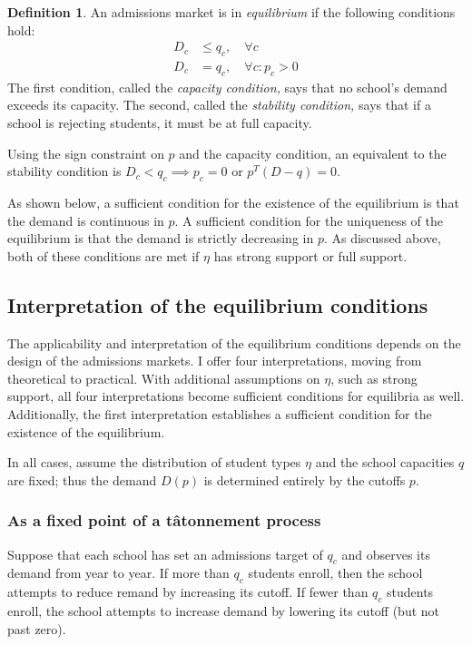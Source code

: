\documentclass[12pt]{article}
\theoremstyle{definition}
\newtheorem{definition}{Definition}
\begin{document}
\begin{definition} \label{marketeqconditions} An admissions market is in \emph{equilibrium} if the following conditions hold:
\begin{align} D_c &\leq q_c, \quad \forall c \label{capacitycondition} \\
D_c &= q_c, \quad \forall c: p_c > 0 \label{stabilitycondition}
\end{align}
The first condition, called the \emph{capacity condition,} says that no school's demand exceeds its capacity. The second, called the \emph{stability condition,} says that if a school is rejecting students, it must be at full capacity.
\end{definition}

Using the sign constraint on $p$ and the capacity condition, an equivalent to the stability condition is $D_c < q_c \implies p_c = 0$ or $p^T \left(D - q\right) = 0$.

As shown below, a sufficient condition for the existence of the equilibrium is that the demand is continuous in $p$. A sufficient condition for the uniqueness of the equilibrium is that the demand is strictly decreasing in $p$. As discussed above, both of these conditions are met if $\eta$ has strong support or full support. 

\subsection{Interpretation of the equilibrium conditions}
The applicability and interpretation of the equilibrium conditions depends on the design of the admissions markets. I offer four interpretations, moving from theoretical to practical. With additional assumptions on $\eta$, such as strong support, all four interpretations become sufficient conditions for equilibria as well. Additionally, the first interpretation establishes a sufficient condition for the existence of the equilibrium. 

In all cases, assume the distribution of student types $\eta$ and the school capacities $q$ are fixed; thus the demand $D(p)$ is determined entirely by the cutoffs $p$. 

\subsubsection{As a fixed point of a t\^{a}tonnement process}
Suppose that each school has set an admissions target of $q_c$ and observes its demand from year to year. If more than $q_c$ students enroll, then the school attempts to reduce remand by increasing its cutoff. If fewer than $q_c$ students enroll, the school attempts to increase demand by lowering its cutoff (but not past zero). 
\end{document}
